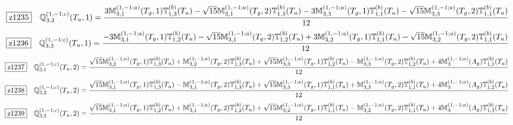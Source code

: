 \documentclass[fleqn,10pt,landscape]{jsarticle}
\begin{document}
\begin{dmath*}
\hspace*{3mm}\fbox{z1235}\quad \mathbb{Q}_{3,2}^{(1,-1;c)}(T_{u},1)=\frac{3 \mathbb{M}_{3,1}^{(1,-1;a)}(T_{g},1) \mathbb{T}_{1,3}^{(b)}(T_{u}) - \sqrt{15} \mathbb{M}_{3,1}^{(1,-1;a)}(T_{g},2) \mathbb{T}_{1,3}^{(b)}(T_{u}) - 3 \mathbb{M}_{3,3}^{(1,-1;a)}(T_{g},1) \mathbb{T}_{1,1}^{(b)}(T_{u}) - \sqrt{15} \mathbb{M}_{3,3}^{(1,-1;a)}(T_{g},2) \mathbb{T}_{1,1}^{(b)}(T_{u})}{12}
\end{dmath*}
\begin{dmath*}
\hspace*{3mm}\fbox{z1236}\quad \mathbb{Q}_{3,3}^{(1,-1;c)}(T_{u},1)=\frac{- 3 \mathbb{M}_{3,1}^{(1,-1;a)}(T_{g},1) \mathbb{T}_{1,2}^{(b)}(T_{u}) - \sqrt{15} \mathbb{M}_{3,1}^{(1,-1;a)}(T_{g},2) \mathbb{T}_{1,2}^{(b)}(T_{u}) + 3 \mathbb{M}_{3,2}^{(1,-1;a)}(T_{g},1) \mathbb{T}_{1,1}^{(b)}(T_{u}) - \sqrt{15} \mathbb{M}_{3,2}^{(1,-1;a)}(T_{g},2) \mathbb{T}_{1,1}^{(b)}(T_{u})}{12}
\end{dmath*}
\begin{dmath*}
\hspace*{3mm}\fbox{z1237}\quad \mathbb{Q}_{3,1}^{(1,-1;c)}(T_{u},2)=\frac{\sqrt{15} \mathbb{M}_{3,2}^{(1,-1;a)}(T_{g},1) \mathbb{T}_{1,3}^{(b)}(T_{u}) + \mathbb{M}_{3,2}^{(1,-1;a)}(T_{g},2) \mathbb{T}_{1,3}^{(b)}(T_{u}) + \sqrt{15} \mathbb{M}_{3,3}^{(1,-1;a)}(T_{g},1) \mathbb{T}_{1,2}^{(b)}(T_{u}) - \mathbb{M}_{3,3}^{(1,-1;a)}(T_{g},2) \mathbb{T}_{1,2}^{(b)}(T_{u}) + 4 \mathbb{M}_{3}^{(1,-1;a)}(A_{g}) \mathbb{T}_{1,1}^{(b)}(T_{u})}{12}
\end{dmath*}
\begin{dmath*}
\hspace*{3mm}\fbox{z1238}\quad \mathbb{Q}_{3,2}^{(1,-1;c)}(T_{u},2)=\frac{\sqrt{15} \mathbb{M}_{3,1}^{(1,-1;a)}(T_{g},1) \mathbb{T}_{1,3}^{(b)}(T_{u}) - \mathbb{M}_{3,1}^{(1,-1;a)}(T_{g},2) \mathbb{T}_{1,3}^{(b)}(T_{u}) + \sqrt{15} \mathbb{M}_{3,3}^{(1,-1;a)}(T_{g},1) \mathbb{T}_{1,1}^{(b)}(T_{u}) + \mathbb{M}_{3,3}^{(1,-1;a)}(T_{g},2) \mathbb{T}_{1,1}^{(b)}(T_{u}) + 4 \mathbb{M}_{3}^{(1,-1;a)}(A_{g}) \mathbb{T}_{1,2}^{(b)}(T_{u})}{12}
\end{dmath*}
\begin{dmath*}
\hspace*{3mm}\fbox{z1239}\quad \mathbb{Q}_{3,3}^{(1,-1;c)}(T_{u},2)=\frac{\sqrt{15} \mathbb{M}_{3,1}^{(1,-1;a)}(T_{g},1) \mathbb{T}_{1,2}^{(b)}(T_{u}) + \mathbb{M}_{3,1}^{(1,-1;a)}(T_{g},2) \mathbb{T}_{1,2}^{(b)}(T_{u}) + \sqrt{15} \mathbb{M}_{3,2}^{(1,-1;a)}(T_{g},1) \mathbb{T}_{1,1}^{(b)}(T_{u}) - \mathbb{M}_{3,2}^{(1,-1;a)}(T_{g},2) \mathbb{T}_{1,1}^{(b)}(T_{u}) + 4 \mathbb{M}_{3}^{(1,-1;a)}(A_{g}) \mathbb{T}_{1,3}^{(b)}(T_{u})}{12}
\end{dmath*}
\end{document}

